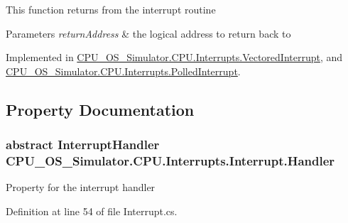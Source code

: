 This function returns from the interrupt routine 


\begin{DoxyParams}{Parameters}
{\em return\+Address} & the logical address to return back to\\
\hline
\end{DoxyParams}


Implemented in \hyperlink{class_c_p_u___o_s___simulator_1_1_c_p_u_1_1_interrupts_1_1_vectored_interrupt_a9a07f2283b9ae7f644dbdccb760f82ce}{C\+P\+U\+\_\+\+O\+S\+\_\+\+Simulator.\+C\+P\+U.\+Interrupts.\+Vectored\+Interrupt}, and \hyperlink{class_c_p_u___o_s___simulator_1_1_c_p_u_1_1_interrupts_1_1_polled_interrupt_a1d9e899d937f97808acaef3060e9e950}{C\+P\+U\+\_\+\+O\+S\+\_\+\+Simulator.\+C\+P\+U.\+Interrupts.\+Polled\+Interrupt}.



\subsection{Property Documentation}
\hypertarget{class_c_p_u___o_s___simulator_1_1_c_p_u_1_1_interrupts_1_1_interrupt_a7d95dcc2cb3e77723328b64172eddeae}{}
\subsubsection[{Handler}]{\setlength{\rightskip}{0pt plus 5cm}abstract {\bf Interrupt\+Handler} C\+P\+U\+\_\+\+O\+S\+\_\+\+Simulator.\+C\+P\+U.\+Interrupts.\+Interrupt.\+Handler\hspace{0.3cm}{\ttfamily [get]}}\label{class_c_p_u___o_s___simulator_1_1_c_p_u_1_1_interrupts_1_1_interrupt_a7d95dcc2cb3e77723328b64172eddeae}


Property for the interrupt handler 



Definition at line 54 of file Interrupt.\+cs.

\hypertarget{class_c_p_u___o_s___simulator_1_1_c_p_u_1_1_interrupts_1_1_interrupt_a8974e3bbe2504027b3a4f8aa64496c11}{}
